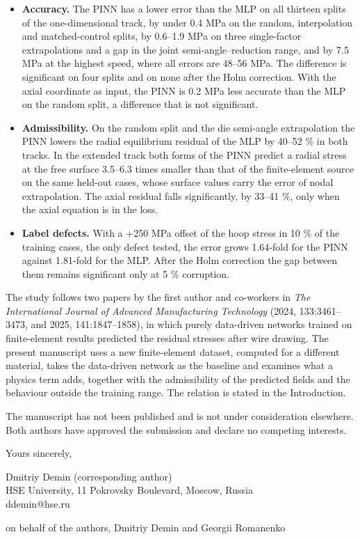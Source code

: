 \documentclass[11pt,a4paper]{article}
\begin{document}
\begin{itemize}\setlength{\itemsep}{2pt}
\item \textbf{Accuracy.} The PINN has a lower error than the MLP on all thirteen splits of the one-dimensional track, by under 0.4 MPa on the random, interpolation and matched-control splits, by 0.6–1.9 MPa on three single-factor extrapolations and a gap in the joint semi-angle–reduction range, and by 7.5 MPa at the highest speed, where all errors are 48–56 MPa. The difference is significant on four splits and on none after the Holm correction. With the axial coordinate as input, the PINN is 0.2 MPa less accurate than the MLP on the random split, a difference that is not significant.
\item \textbf{Admissibility.} On the random split and the die semi-angle extrapolation the PINN lowers the radial equilibrium residual of the MLP by 40–52 \% in both tracks. In the extended track both forms of the PINN predict a radial stress at the free surface 3.5–6.3 times smaller than that of the finite-element source on the same held-out cases, whose surface values carry the error of nodal extrapolation. The axial residual falls significantly, by 33–41 \%, only when the axial equation is in the loss.
\item \textbf{Label defects.} With a +250 MPa offset of the hoop stress in 10 \% of the training cases, the only defect tested, the error grows 1.64-fold for the PINN against 1.81-fold for the MLP. After the Holm correction the gap between them remains significant only at 5 \% corruption.
\end{itemize}
The study follows two papers by the first author and co-workers in \emph{The International Journal of Advanced Manufacturing Technology} (2024, 133:3461–3473, and 2025, 141:1847–1858), in which purely data-driven networks trained on finite-element results predicted the residual stresses after wire drawing. The present manuscript uses a new finite-element dataset, computed for a different material, takes the data-driven network as the baseline and examines what a physics term adds, together with the admissibility of the predicted fields and the behaviour outside the training range. The relation is stated in the Introduction.

The manuscript has not been published and is not under consideration elsewhere. Both authors have approved the submission and declare no competing interests.

Yours sincerely,

Dmitriy Demin (corresponding author)\\
HSE University, 11 Pokrovsky Boulevard, Moscow, Russia\\
ddemin@hse.ru

on behalf of the authors, Dmitriy Demin and Georgii Romanenko
\end{document}
